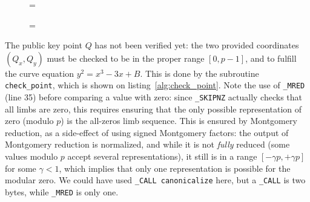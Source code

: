 \documentclass{llncs}
\newenvironment{forbidpagebreak}
    {\par\nobreak\vfil\penalty 0\vfilneg
     \vtop\bgroup}
    {\par\xdef\tpd{\the\prevdepth}\egroup
     \prevdepth=\tpd}
\begin{document}
\begin{figure}
\begin{forbidpagebreak}

\end{forbidpagebreak}
\end{figure}

\begin{figure}
\begin{forbidpagebreak}

\end{forbidpagebreak}
\end{figure}

The public key point $Q$ has not been verified yet: the
two provided coordinates $(Q_x, Q_y)$ must be checked to be in the
proper range $[0, p-1]$, and to fulfill the curve equation $y^2 = x^3 -
3x + B$. This is done by the subroutine \verb+check_point+, which is
shown on listing~\ref{alg:check_point}. Note the use of \verb+_MRED+
(line 35) before comparing a value with zero: since \verb+_SKIPNZ+
actually checks that all limbs are zero, this requires ensuring that the
only possible representation of zero (modulo $p$) is the all-zeros limb
sequence. This is ensured by Montgomery reduction, as a side-effect of
using signed Montgomery factors: the output of Montgomery reduction is
normalized, and while it is not \emph{fully} reduced (some values modulo
$p$ accept several representations), it still is in a range $[-\gamma p,
+\gamma p]$ for some $\gamma < 1$, which implies that only one
representation is possible for the modular zero. We could have used
\verb+_CALL canonicalize+ here, but a \verb+_CALL+ is two bytes, while
\verb+_MRED+ is only one.
\end{document}
